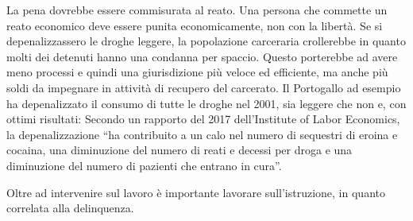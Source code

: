 \documentclass[12pt]{book} %
\begin{document}
La pena dovrebbe essere commisurata al reato. Una persona
che commette un reato economico deve essere punita economicamente, non con la libertà.
Se si depenalizzassero le droghe leggere, la popolazione carceraria crollerebbe in quanto molti dei detenuti
hanno una condanna per spaccio. Questo porterebbe ad avere meno processi e quindi una giurisdizione più veloce ed efficiente,
ma anche più soldi da impegnare in attività di recupero del carcerato. Il Portogallo ad esempio ha depenalizzato il
consumo di tutte le droghe nel 2001, sia leggere che non e, con ottimi risultati: Secondo un rapporto del 2017
dell'Institute of Labor
Economics, la depenalizzazione “ha contribuito a un calo nel numero di sequestri di eroina e cocaina, una diminuzione del
numero di reati e decessi per droga e una diminuzione del numero di pazienti che entrano in cura”. 

Oltre ad intervenire sul lavoro è importante lavorare sull'istruzione, in quanto correlata alla delinquenza.
\end{document}
